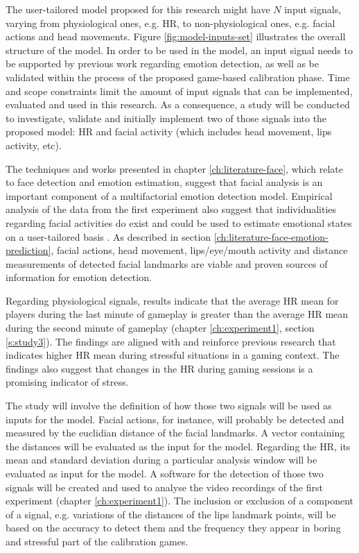 The user-tailored model proposed for this research might have $N$ input signals, varying from physiological ones, e.g. HR, to non-physiological ones, e.g. facial actions and head movements. Figure \ref{fig:model-inputs-set} illustrates the overall structure of the model. In order to be used in the model, an input signal needs to be supported by previous work regarding emotion detection, as well as be validated within the process of the proposed game-based calibration phase. Time and scope constraints limit the amount of input signals that can be implemented, evaluated and used in this research. As a consequence, a study will be conducted to investigate, validate and initially implement two of those signals into the proposed model: HR and facial activity (which includes head movement, lips activity, etc).

The techniques and works presented in chapter \ref{ch:literature-face}, which relate to face detection and emotion estimation, suggest that facial analysis is an important component of a multifactorial emotion detection model. Empirical analysis of the data from the first experiment also suggest that individualities regarding facial activities do exist and could be used to estimate emotional states on a user-tailored basis \parencite{bevilacqua2016variations}. As described in section \ref{ch:literature-face-emotion-prediction}, facial actions, head movement, lips/eye/mouth activity and distance measurements of detected facial landmarks are viable and proven sources of information for emotion detection.

Regarding physiological signals, results indicate that the average HR mean for players during the last minute of gameplay is greater than the average HR mean during the second minute of gameplay (chapter \ref{ch:experiment1}, section \ref{s:study3}). The findings are aligned with and reinforce previous research that indicates higher HR mean during stressful situations in a gaming context. The findings also suggest that changes in the HR during gaming sessions is a promising indicator of stress.

The study will involve the definition of how those two signals will be used as inputs for the model. Facial actions, for instance, will probably be detected and measured by the euclidian distance of the facial landmarks. A vector containing the distances will be evaluated as the input for the model. Regarding the HR, its mean and standard deviation during a particular analysis window will be evaluated as input for the model. A software for the detection of those two signals will be created and used to analyse the video recordings of the first experiment (chapter \ref{ch:experiment1}). The inclusion or exclusion of a component of a signal, e.g. variations of the distances of the lips landmark points, will be based on the accuracy to detect them and the frequency they appear in boring and stressful part of the calibration games.

